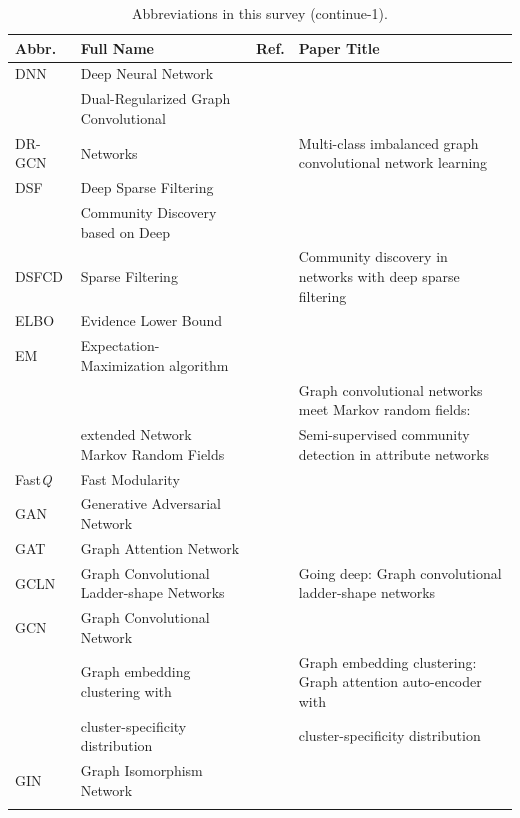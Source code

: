\begin{table}[!t]
\centering \footnotesize
\renewcommand\arraystretch{1.2}
\caption{Abbreviations in this survey (continue-1).}
\begin{tabular}{llll}
\toprule[1pt]
\textbf{Abbr.} & \textbf{Full Name} & \textbf{Ref.} & \textbf{Paper Title} \\ \midrule
\rowcolor{gray!30}
DNN & Deep Neural Network & & \\
& Dual-Regularized Graph Convolutional &  &  \\
\multirow{-2}{*}{DR-GCN} & Networks & \multirow{-2}{*}{} & \multirow{-2}{*}{Multi-class imbalanced graph convolutional network learning} \\
\rowcolor{gray!30}
DSF & Deep Sparse Filtering & & \\
& Community Discovery based on Deep &  &  \\
\multirow{-2}{*}{DSFCD} & Sparse Filtering & \multirow{-2}{*}{} & \multirow{-2}{*}{Community discovery in networks with deep sparse filtering} \\ \midrule
\rowcolor{gray!30}
ELBO & Evidence Lower Bound & &  \\
EM & Expectation-Maximization algorithm  & & \\
\rowcolor{gray!30}
&  &  & Graph convolutional networks meet Markov random fields: \\ 
\rowcolor{gray!30}
\multirow{-2}{*}{eMRF} & \multirow{-2}{*}{extended Network Markov Random Fields} & \multirow{-2}{*}{} & Semi-supervised community detection in attribute networks \\ \midrule
Fast\textit{Q} & Fast Modularity &  &  \\ \midrule
\rowcolor{gray!30}
GAN & Generative Adversarial Network &  &  \\
GAT & Graph Attention Network &  &  \\
\rowcolor{gray!30}
GCLN & Graph Convolutional Ladder-shape Networks &  & Going deep: Graph convolutional ladder-shape networks \\
GCN & Graph Convolutional Network &  &  \\
\rowcolor{gray!30}
& Graph embedding clustering with & & Graph embedding clustering: Graph attention auto-encoder with  \\
\rowcolor{gray!30}
\multirow{-2}{*}{GEC-CSD} & cluster-specificity distribution & \multirow{-2}{*}{} & cluster-specificity distribution \\
GIN & Graph Isomorphism Network & &  \\
\rowcolor{gray!30}

\end{tabular}
\end{table}

